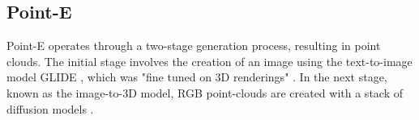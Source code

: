 \subsection{Point-E}
\label{pointE}

Point-E operates through a two-stage generation process, resulting in point clouds. The initial stage involves the creation of an image using the text-to-image model GLIDE \citep{nicholGLIDE}, which was "fine tuned on 3D renderings" \citep{nicholPointE}. In the next stage, known as the image-to-3D model, RGB point-clouds are created with a stack of diffusion models \citep{nicholPointE}.
